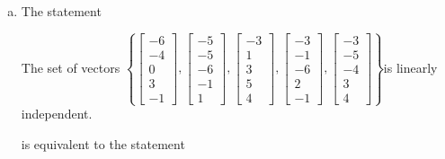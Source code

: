 \begin{exerciseAnswer}
\begin{enumerate}[(a)]
\item The statement 
\begin{center}\begin{minipage}{0.8\textwidth}
 The set of vectors \( \left\{ \left[\begin{array}{c}
-6 \\
-4 \\
0 \\
3 \\
-1
\end{array}\right] , \left[\begin{array}{c}
-5 \\
-5 \\
-6 \\
-1 \\
1
\end{array}\right] , \left[\begin{array}{c}
-3 \\
1 \\
3 \\
5 \\
4
\end{array}\right] , \left[\begin{array}{c}
-3 \\
-1 \\
-6 \\
2 \\
-1
\end{array}\right] , \left[\begin{array}{c}
-3 \\
-5 \\
-4 \\
3 \\
4
\end{array}\right] \right\} \)is linearly independent.
\end{minipage}\end{center}
     is equivalent to the statement 
\begin{center}\begin{minipage}{0.8\textwidth}
 The vector equation \( x_{1} \left[\begin{array}{c}
-6 \\
-4 \\
0 \\
3 \\
-1
\end{array}\right] + x_{2} \left[\begin{array}{c}
-5 \\
-5 \\

\end{array}
\end{minipage}
\end{center}
\end{enumerate}
\end{exerciseAnswer}
